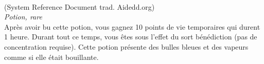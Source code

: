 \\
{\small (System Reference Document trad. Aidedd.org)}\\
{\small \it Potion, rare}\\
Après avoir bu cette potion, vous gagnez 10 points de vie temporaires qui durent 1 heure. Durant tout ce temps, vous êtes sous l'effet du sort bénédiction (pas de concentration requise). Cette potion présente des bulles bleues et des vapeurs comme si elle était bouillante. \\

